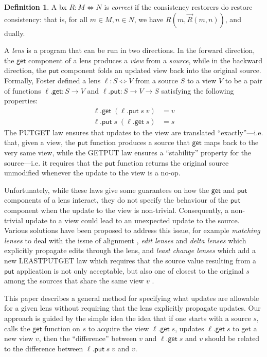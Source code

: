 \documentclass[acmsmall,review,anonymous]{acmart}\settopmatter{printfolios=true,printccs=false,printacmref=false}
\theoremstyle{definition}
\newtheorem{definition}{Definition}
\newcommand{\kw}[1]{\ensuremath{\mathsf{#1}}\xspace}
\newcommand{\get}{\ensuremath{\kw{get}}\xspace}
\newcommand{\pput}{\ensuremath{\kw{put}}\xspace}
\begin{document}
\begin{definition}
A bx $R : M \Leftrightarrow N$ is {\em correct} if the consistency restorers do
restore consistency: that is, for all $m \in M, n \in N$, we have $R(m,
\overrightarrow{R}(m, n))$, and dually.
\end{definition}
\iffalse
A {\em lens} is a program that can be run in two directions. In the
forward direction, the \get component of a lens produces a {\em view}
from a {\em source}, while in the backward direction, the \pput component folds
an updated view back into the original source. Formally, Foster
\cite{foster2007combinators} defined a lens $\ell : S
\Leftrightarrow V$ from a source $S$ to a view $V$ to be a pair of functions
$\ell.\get : S \longrightarrow V$ and $\ell.\pput : S \longrightarrow V
\longrightarrow S$ satisfying the
following properties:
\begin{align*}
\ell.\get \; (\ell.\pput \; s \; v) &= v \tag{PUTGET}\\
\ell.\pput \; s \; (\ell.\get \; s) &= s \tag{GETPUT}
\end{align*}
The PUTGET law ensures that updates to the view are translated
``exactly''---i.e. that, given a view, the \pput function produces a source
that \get maps back to the very same view, while the GETPUT law ensures a
``stability'' property for the source---i.e. it requires that the \pput
function returns the original source unmodified whenever the update to the view
is a no-op.

Unfortunately, while these laws give some guarantees on how the \get and \pput
components of a lens interact, they do not specify the behaviour of the \pput
component when the update to the view is non-trivial. Consequently, a
non-trivial update to a view could lead to an unexpected update to the source.
Various solutions have been proposed to address this issue, for example {\em
matching lenses} to deal with the issue of alignment \cite{barbosa2010matching},
{\em edit lenses} \cite{hofmann2012edit} and {\em delta lenses}
\cite{diskin2011asymmetric,diskin2011state,pacheco2012delta} which explicitly
propagate edits through the lens, and {\em least change lenses} which
add a new LEASTPUTGET law which requires that the source value resulting from a
\pput application is not only acceptable, but also one of closest to the
original $s$ among the sources that share the same view $v$
\cite{macedo2013composing}.

This paper describes a general method for specifying what updates are allowable
for a given lens without requiring that the lens explicitly propagate updates.
Our approach is guided by the simple idea the idea that if one starts with a
source $s$, calls the \get function on $s$ to acquire the view $\ell.\get \;
s$, updates $\ell.\get \; s$ to get a new view $v$, then the ``difference''
between $v$ and $\ell.\get \; s$ and $v$ should be related to the difference
between $\ell.\pput \; s \; v$ and $v$.
\end{document}
